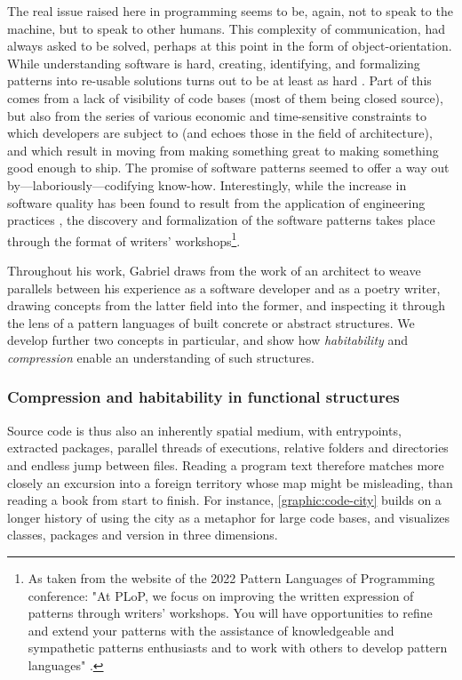 The real issue raised here in programming seems to be, again, not to speak to the machine, but to speak to other humans. This complexity of communication, had always asked to be solved, perhaps at this point in the form of object-orientation. While understanding software is hard, creating, identifying, and formalizing patterns into re-usable solutions turns out to be at least as hard \citep{taylor_patterns_2001}. Part of this comes from a lack of visibility of code bases (most of them being closed source), but also from the series of various economic and time-sensitive constraints to which developers are subject to (and echoes those in the field of architecture), and which result in moving from making something great to making something good enough to ship. The promise of software patterns seemed to offer a way out by—laboriously—codifying know-how. Interestingly, while the increase in software quality has been found to result from the application of engineering practices \citep{hoare_how_1996}, the discovery and formalization of the software patterns takes place through the format of writers' workshops\footnote{As taken from the website of the 2022 Pattern Languages of Programming conference: "At PLoP, we focus on improving the written expression of patterns through writers' workshops. You will have opportunities to refine and extend your patterns with the assistance of knowledgeable and sympathetic patterns enthusiasts and to work with others to develop pattern languages" \citep{guerra_plop_2022}.}.

Throughout his work, Gabriel draws from the work of an architect to weave parallels between his experience as a software developer and as a poetry writer, drawing concepts from the latter field into the former, and inspecting it through the lens of a pattern languages of built concrete or abstract structures. We develop further two concepts in particular, and show how \emph{habitability} and \emph{compression} enable an understanding of such structures.

\subsubsection{Compression and habitability in functional structures}
\label{subsubsec:compression-habitability}

Source code is thus also an inherently spatial medium, with entrypoints, extracted packages, parallel threads of executions, relative folders and directories and endless jump between files. Reading a program text therefore matches more closely an excursion into a foreign territory whose map might be misleading, than reading a book from start to finish. For instance, \ref{graphic:code-city} builds on a longer history of using the city as a metaphor for large code bases, and visualizes classes, packages and version in three dimensions.

